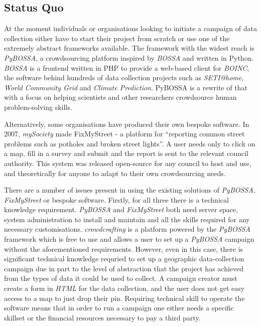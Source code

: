 \documentclass{article}
\begin{document}
		\subsection{Status Quo}
		At the moment individuals or organisations looking to initiate a campaign of data collection either have to start their project from scratch or use one of the extremely abstract frameworks available.
		The framework with the widest reach is \textit{PyBOSSA}, a crowdsourcing platform inspired by \textit{BOSSA} and written in Python. \textit{BOSSA} is a frontend written in PHP to provide a web-based client for \textit{BOINC}, the software behind hundreds of data collection projects such as \textit{SETI@home}, \textit{World Community Grid} and \textit{Climate Prediction}\cite{_boinc_2015}.
		PyBOSSA is a rewrite of that with a focus on helping scientists and other researchers crowdsource human problem-solving skills.

		Alternatively, some organisations have produced their own bespoke software. In 2007, \textit{mySociety} made FixMyStreet - a platform for ``reporting common street problems such as potholes and broken street lights''\cite{_mysociety/fixmystreet_2015}.
		A user needs only to click on a map, fill in a survey and submit and the report is sent to the relevant council authority.
		This system was released open-source for any council to host and use, and theoretically for anyone to adapt to their own crowdsourcing needs.

		There are a number of issues present in using the existing solutions of \textit{PyBOSSA}, \textit{FixMyStreet} or bespoke software. Firstly, for all three there is a technical knowledge requirement. \textit{PyBOSSA} and \textit{FixMyStreet} both need server space, system administration to install and maintain and all the skills required for any necessary customisations.
		\textit{crowdcrafting} is a platform powered by the \textit{PyBOSSA} framework which is free to use and allows a user to set up a \textit{PyBOSSA} campaign without the aforementioned requirements.
		However, even in this case, there is significant technical knowledge requried to set up a geographic data-collection campaign due in part to the level of abstraction that the project has achieved from the types of data it could be used to collect.
		A campaign creator must create a form in \textit{HTML} for the data collection, and the user does not get easy access to a map to just drop their pin. Requiring technical skill to operate the software means that in order to run a campaign one either needs a specific skillset or the financial resources necessary to pay a third party.
\end{document}
